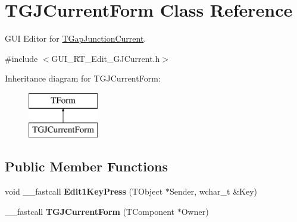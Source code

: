\hypertarget{class_t_g_j_current_form}{\section{T\+G\+J\+Current\+Form Class Reference}
\label{class_t_g_j_current_form}
}


G\+U\+I Editor for \hyperlink{class_t_gap_junction_current}{T\+Gap\+Junction\+Current}.  




{\ttfamily \#include $<$G\+U\+I\+\_\+\+R\+T\+\_\+\+Edit\+\_\+\+G\+J\+Current.\+h$>$}

Inheritance diagram for T\+G\+J\+Current\+Form\+:\begin{figure}[H]
\begin{center}
\leavevmode
\includegraphics[height=2.000000cm]{class_t_g_j_current_form}
\end{center}
\end{figure}
\subsection*{Public Member Functions}
\begin{DoxyCompactItemize}
\item 
\hypertarget{class_t_g_j_current_form_a87634c2344adc1506087353f7bdd3e91}{void \+\_\+\+\_\+fastcall {\bfseries Edit1\+Key\+Press} (T\+Object $\ast$Sender, wchar\+\_\+t \&Key)}\label{class_t_g_j_current_form_a87634c2344adc1506087353f7bdd3e91}

\item 
\hypertarget{class_t_g_j_current_form_aa1ce2b1f52aec3b0fb1c1bcb78fc0e29}{\+\_\+\+\_\+fastcall {\bfseries T\+G\+J\+Current\+Form} (T\+Component $\ast$Owner)}\label{class_t_g_j_current_form_aa1ce2b1f52aec3b0fb1c1bcb78fc0e29}

\end{DoxyCompactItemize}
